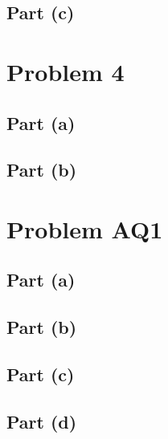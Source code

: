 \documentclass[11pt]{article}
\begin{document}
\subsection*{Part (c)}
\section*{Problem 4}
\subsection*{Part (a)}
\subsection*{Part (b)}
\section*{Problem AQ1}
\subsection*{Part (a)}
\subsection*{Part (b)}
\subsection*{Part (c)}
\subsection*{Part (d)}
\end{document}
